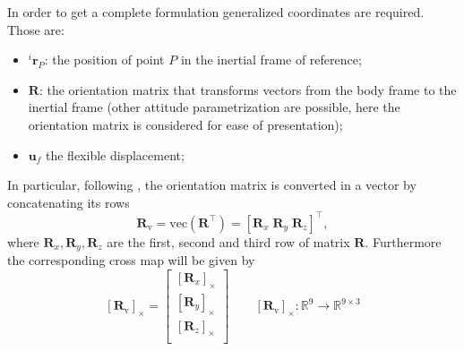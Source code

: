 \documentclass{svjour3}                     %
\newcommand{\crmat}[1]{\ensuremath{[#1]_{\times}}}
\begin{document}
In order to get a complete formulation generalized coordinates are required. Those are:
\begin{itemize}
	\item $^i \bm{r}_P$: the position of point $P$ in the inertial frame of reference;
	\item $\bm{R}$: the orientation matrix that transforms vectors from the body frame to the inertial frame (other attitude parametrization are possible, here the orientation matrix is considered for ease of presentation);
	\item $\bm{u}_f$ the flexible displacement;
\end{itemize}

In particular, following \cite{attitude_ph}, the orientation matrix is converted in a vector by concatenating its rows
\begin{equation*}
\bm{R}_{\text{v}} = \text{vec}(\bm{R}^\top) = [\bm{R}_x \; \bm{R}_y \; \bm{R}_z]^\top,
\end{equation*}
where $\bm{R}_{x}, \bm{R}_{y}, \bm{R}_{z}$ are the first, second and third row of matrix $\bm{R}$. Furthermore the corresponding cross map will be given by
\begin{equation*}
\crmat{\bm{R}_{\text{v}}} = 
\begin{bmatrix}
\crmat{\bm{R}_x} \\
\crmat{\bm{R}_y} \\
\crmat{\bm{R}_z} \\
\end{bmatrix} \qquad 
\crmat{\bm{R}_{\text{v}}} : \mathbb{R}^9 \rightarrow \mathbb{R}^{9 \times 3}
\end{equation*}
\end{document}
